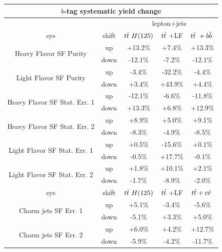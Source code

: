 \begin{description}
 \begin{table}[hbtp] \small
   \centering 
    \begin{tabular}{|c|c|c|c|c|} \hline 
 \multicolumn{5}{|c|}{$b$-tag systematic yield change} \\ \hline
 \multicolumn{2}{|c}{ } & \multicolumn{3}{|c|}{lepton+jets} \\ \hline
 sys & shift & $t{\bar{t}}~ H(125)$ & $t{\bar{t}}~$+LF & $t{\bar{t}}~ + b{\bar{b}}~$  \\ \hline 
 \multirow{2}{*}{Heavy Flavor SF Purity} & up   & +13.2\% & +7.4\% & +13.3\% \\
                                         & down & -12.1\% & -7.2\% & -12.1\% \\ 
 \hline
 \multirow{2}{*}{Light Flavor SF Purity} & up   & -3.4\% & -32.2\%  & -4.4\%   \\
                                         & down & +3.4\% & +43.9\%  & +4.4\% \\ 
 \hline
 \multirow{2}{*}{Heavy Flavor SF Stat. Err. 1} & up   & -12.1\% & -6.6\%  & -11.8\%   \\
                                               & down & +13.3\% & +6.8\%  & +12.9\% \\ 
 \hline
 \multirow{2}{*}{Heavy Flavor SF Stat. Err. 2} & up   & +8.9\% & +5.0\%  & +9.1\%   \\
                                               & down & -8.3\% & -4.9\%  & -8.5\% \\ 
 \hline
 \multirow{2}{*}{Light Flavor SF Stat. Err. 1} & up   & +0.5\% & -15.6\%  & +0.1\%   \\
                                               & down & -0.5\% & +17.7\%  & -0.1\% \\ 
 \hline
 \multirow{2}{*}{Light Flavor SF Stat. Err. 2} & up   & +1.8\% & +10.1\%  & +2.1\%   \\
                                               & down & -1.7\% &  -8.9\%  & -2.0\% \\ 
 \hline
 sys & shift & $t{\bar{t}}~ H(125)$ & $t{\bar{t}}~$+LF & $t{\bar{t}}+c{\bar{c}}~$ \\ \hline 
 \multirow{2}{*}{Charm jets SF Err. 1} & up   & +5.1\% & -3.4\%  & -5.6\%   \\
                                       & down & -5.1\% & +3.3\%  & +5.0\% \\ 
 \hline
 \multirow{2}{*}{Charm jets SF Err. 2} & up   & +6.0\% & +4.2\%  & +12.7\%   \\
                                       & down & -5.9\% & -4.2\%  & -11.7\% \\ 
 \hline


\end{tabular}
\end{table}
\end{description}
